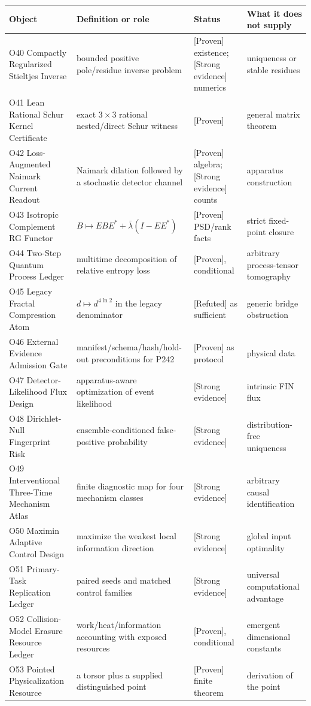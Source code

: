 \documentclass[11pt,a4paper,openany]{report}
\newcommand{\statusProven}{\textcolor{fingreen}{[Proven]}}
\newcommand{\statusStrong}{\textcolor{finblue}{[Strong evidence]}}
\newcommand{\statusRefuted}{\textcolor{finred}{[Refuted]}}
\begin{document}
\begin{center}
\begingroup\small
\setlength{\tabcolsep}{2.5pt}
\renewcommand{\arraystretch}{1.16}
\begin{longtable}{@{}p{}p{}p{}p{}@{}}
\toprule
\textbf{Object} & \textbf{Definition or role} & \textbf{Status} & \textbf{What it does not supply} \\
\midrule
\endhead
O40 Compactly Regularized Stieltjes Inverse & bounded positive pole/\allowbreak{}residue inverse problem & \statusProven{} existence; \statusStrong{} numerics & uniqueness or stable residues \\
O41 Lean Rational Schur Kernel Certificate & exact \(3\times3\) rational nested/\allowbreak{}direct Schur witness & \statusProven{} & general matrix theorem \\
O42 Loss-Augmented Naimark Current Readout & Naimark dilation followed by a stochastic detector channel & \statusProven{} algebra; \statusStrong{} counts & apparatus construction \\
O43 Isotropic Complement RG Functor & \(B\mapsto EBE^\ast+\bar\lambda(I-EE^\ast)\) & \statusProven{} PSD/\allowbreak{}rank facts & strict fixed-point closure \\
O44 Two-Step Quantum Process Ledger & multitime decomposition of relative entropy loss & \statusProven{}, conditional & arbitrary process-tensor tomography \\
O45 Legacy Fractal Compression Atom & \(d\mapsto d^{4\ln2}\) in the legacy denominator & \statusRefuted{} as sufficient & generic bridge obstruction \\
O46 External Evidence Admission Gate & manifest/\allowbreak{}schema/\allowbreak{}hash/\allowbreak{}hold-out preconditions for P242 & \statusProven{} as protocol & physical data \\
O47 Detector-Likelihood Flux Design & apparatus-aware optimization of event likelihood & \statusStrong{} & intrinsic FIN flux \\
O48 Dirichlet-Null Fingerprint Risk & ensemble-conditioned false-positive probability & \statusStrong{} & distribution-free uniqueness \\
O49 Interventional Three-Time Mechanism Atlas & finite diagnostic map for four mechanism classes & \statusStrong{} & arbitrary causal identification \\
O50 Maximin Adaptive Control Design & maximize the weakest local information direction & \statusStrong{} & global input optimality \\
O51 Primary-Task Replication Ledger & paired seeds and matched control families & \statusStrong{} & universal computational advantage \\
O52 Collision-Model Erasure Resource Ledger & work/\allowbreak{}heat/\allowbreak{}information accounting with exposed resources & \statusProven{}, conditional & emergent dimensional constants \\
O53 Pointed Physicalization Resource & a torsor plus a supplied distinguished point & \statusProven{} finite theorem & derivation of the point \\
\bottomrule
\end{longtable}
\endgroup
\end{center}
\end{document}
